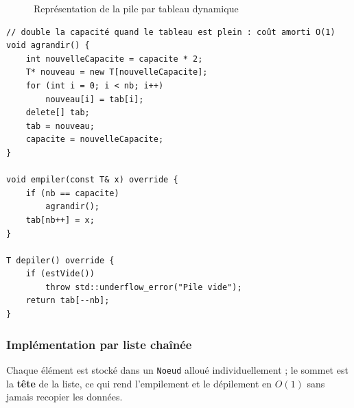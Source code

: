 \documentclass[11pt,a4paper]{article}
\newcommand{\code}[1]{\texttt{#1}}
\begin{document}
\begin{figure}[H]
\centering
{}
\caption{Représentation de la pile par tableau dynamique}
\end{figure}

\begin{lstlisting}[caption={Méthodes essentielles de \code{PileTableau<T>}}]
// double la capacité quand le tableau est plein : coût amorti O(1)
void agrandir() {
    int nouvelleCapacite = capacite * 2;
    T* nouveau = new T[nouvelleCapacite];
    for (int i = 0; i < nb; i++)
        nouveau[i] = tab[i];
    delete[] tab;
    tab = nouveau;
    capacite = nouvelleCapacite;
}

void empiler(const T& x) override {
    if (nb == capacite)
        agrandir();
    tab[nb++] = x;
}

T depiler() override {
    if (estVide())
        throw std::underflow_error("Pile vide");
    return tab[--nb];
}
\end{lstlisting}

\subsubsection{Implémentation par liste chaînée}

Chaque élément est stocké dans un \code{Noeud} alloué individuellement ;
le sommet est la \textbf{tête} de la liste, ce qui rend l'empilement et le
dépilement en $O(1)$ sans jamais recopier les données.
\end{document}

